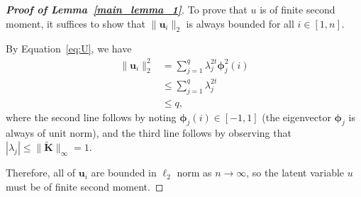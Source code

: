 \documentclass[11pt]{article}
\theoremstyle{definition}
\begin{document}
\begin{proof}[\textbf{Proof of Lemma~\ref{main_lemma_1}}]
To prove that $u$ is of finite second moment, it suffices to show that $\|\mathbf{u}_{i}\|_{2}$ is always bounded for all $i \in [1,n]$.

By Equation~\ref{eq:U}, we have 
\begin{align*}
\| \mathbf{u}_i \|_{2}^{2}  &= \sum_{j=1}^{q} \lambda^{2t}_{j}\mathbf{\phi}_{j}^{2}(i) \\ 
& \leq \sum_{j=1}^{q} \lambda^{2t}_{j} \\
& \leq q,
\end{align*}
where the second line follows by noting $\mathbf{\phi}_{j}(i) \in [-1,1]$ (the eigenvector $\mathbf{\phi}_{j}$ is always of unit norm), and the third line follows by observing that $| \lambda_{j}| \leq \|\widetilde{\mathbf{K}}\|_{\infty}= 1$.

Therefore, all of $\mathbf{u}_{i}$ are bounded in $\ell_{2}$ norm as $n \rightarrow \infty$, so the latent variable $u$ must be of finite second moment.
\end{proof}
\end{document}
